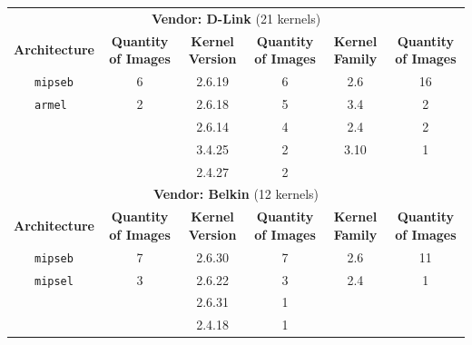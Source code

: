 \begin{table}[h]
{\begin{tabular}{cccccc}
\multicolumn{6}{c}{\textbf{Vendor: D-Link} (21 kernels)}                                                                    \\
\textbf{Architecture} & \multicolumn{1}{c|}{\textbf{Quantity of Images}} & \textbf{Kernel Version} & \multicolumn{1}{c|}{\textbf{Quantity of Images}} & \textbf{Kernel Family} & \textbf{Quantity of Images} \\ \hline
{\tt mipseb}            & \multicolumn{1}{c|}{6}                & 2.6.19                 & \multicolumn{1}{c|}{6}                           & 2.6                     & 16                         \\
{\tt armel }            & \multicolumn{1}{c|}{2}                & 2.6.18                  & \multicolumn{1}{c|}{5}                          & 3.4                     & 2                          \\
                        & \multicolumn{1}{c|}{}                 & 2.6.14                  & \multicolumn{1}{c|}{4}                          & 2.4                     & 2                          \\
                        & \multicolumn{1}{c|}{}                 & 3.4.25                  & \multicolumn{1}{c|}{2}                          & 3.10                    & 1                          \\
                        & \multicolumn{1}{c|}{}                 & 2.4.27                  & \multicolumn{1}{c|}{2}                          &                         &                            \\ \hline

\multicolumn{6}{c}{\textbf{Vendor: Belkin} (12 kernels)}                                                                    \\
\textbf{Architecture} & \multicolumn{1}{c|}{\textbf{Quantity of Images}} & \textbf{Kernel Version} & \multicolumn{1}{c|}{\textbf{Quantity of Images}} & \textbf{Kernel Family} & \textbf{Quantity of Images} \\ \hline
{\tt mipseb}            & \multicolumn{1}{c|}{7}                & 2.6.30                  & \multicolumn{1}{c|}{7}                          & 2.6                     & 11                         \\
{\tt mipsel}            & \multicolumn{1}{c|}{3}                & 2.6.22                  & \multicolumn{1}{c|}{3}                          & 2.4                     & 1                          \\
                        & \multicolumn{1}{c|}{}                 & 2.6.31                  & \multicolumn{1}{c|}{1}                          &                         &                            \\
                        & \multicolumn{1}{c|}{}                 & 2.4.18                  & \multicolumn{1}{c|}{1}                          &                         &                            \\ \hline


\end{tabular}}
\end{table}
